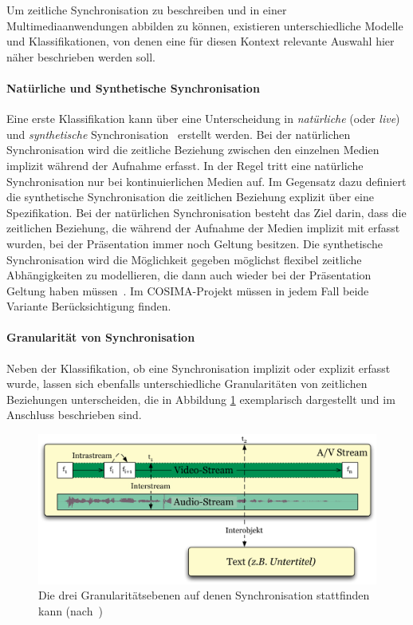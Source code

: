   Um zeitliche Synchronisation zu beschreiben und in einer Multimediaanwendungen abbilden zu können, existieren unterschiedliche Modelle und Klassifikationen, von denen eine für diesen Kontext relevante Auswahl hier näher beschrieben werden soll.
  
\paragraph{Natürliche und Synthetische Synchronisation} %
\label{par:natuerliche_und_synthetische_synchronisation}

  Eine erste Klassifikation kann über eine Unterscheidung in \emph{natürliche} (oder \emph{live}) und \emph{synthetische} Synchronisation~\citep{little1991ms,little1991msp,steinmetz1992mst} erstellt werden. Bei der natürlichen Synchronisation wird die zeitliche Beziehung zwischen den einzelnen Medien implizit während der Aufnahme erfasst. In der Regel tritt eine natürliche Synchronisation nur bei kontinuierlichen Medien auf. Im Gegensatz dazu definiert die synthetische Synchronisation die zeitlichen Beziehung explizit über eine Spezifikation. Bei der natürlichen Synchronisation besteht das Ziel darin, dass die zeitlichen Beziehung, die während der Aufnahme der Medien implizit mit erfasst wurden, bei der Präsentation immer noch Geltung besitzen. Die synthetische Synchronisation wird die Möglichkeit gegeben möglichst flexibel zeitliche Abhängigkeiten zu modellieren, die dann auch wieder bei der Präsentation Geltung haben müssen~\citep[S. 613]{bertino1998tsm}. Im COSIMA-Projekt müssen in jedem Fall beide Variante Berücksichtigung finden.
  

\paragraph{Granularität von Synchronisation} %
\label{par:granularitaet_von_synchronisation}

  Neben der Klassifikation, ob eine Synchronisation implizit oder explizit erfasst wurde, lassen sich ebenfalls unterschiedliche Granularitäten von zeitlichen Beziehungen unterscheiden, die in Abbildung \ref{fig:granularitaetsebenen} exemplarisch dargestellt und im Anschluss beschrieben sind.
  
  \begin{figure}[!ht]
    \centering
      \includegraphics[width=.9\textwidth]{images/Granularitaetsebenen.pdf}
    \caption{Die drei Granularitätsebenen auf denen Synchronisation stattfinden kann (nach~\citep{antons09})}
    \label{fig:granularitaetsebenen}
  \end{figure}
  
